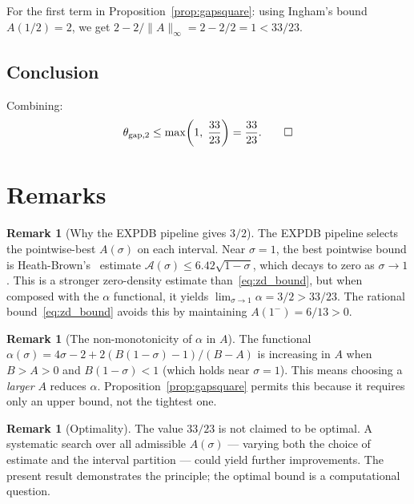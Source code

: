 \documentclass[11pt,a4paper]{amsart}
\theoremstyle{plain}
\theoremstyle{definition}
\newtheorem{remark}[theorem]{Remark}
\begin{document}
For the first term in Proposition~\ref{prop:gapsquare}: using Ingham's bound $A(1/2) = 2$, we get $2 - 2/\|A\|_\infty = 2 - 2/2 = 1 < 33/23$.

\subsection{Conclusion}

Combining:
\[
\theta_{\mathrm{gap},2} \leq \max\!\left(1,\; \frac{33}{23}\right) = \frac{33}{23}. \qedhere
\]

\section{Remarks}

\begin{remark}[Why the EXPDB pipeline gives $3/2$]
The EXPDB pipeline selects the pointwise-best $A(\sigma)$ on each interval. Near $\sigma = 1$, the best pointwise bound is Heath-Brown's~\cite{HeathBrown2017} estimate $\mathcal{A}(\sigma) \leq 6.42\sqrt{1-\sigma}$, which decays to zero as $\sigma \to 1$. This is a stronger zero-density estimate than~\eqref{eq:zd_bound}, but when composed with the $\alpha$ functional, it yields $\lim_{\sigma \to 1} \alpha = 3/2 > 33/23$. The rational bound~\eqref{eq:zd_bound} avoids this by maintaining $A(1^-) = 6/13 > 0$.
\end{remark}

\begin{remark}[The non-monotonicity of $\alpha$ in $A$]
The functional $\alpha(\sigma) = 4\sigma - 2 + 2(B(1-\sigma) - 1)/(B - A)$ is increasing in $A$ when $B > A > 0$ and $B(1-\sigma) < 1$ (which holds near $\sigma = 1$). This means choosing a \emph{larger} $A$ reduces $\alpha$. Proposition~\ref{prop:gapsquare} permits this because it requires only an upper bound, not the tightest one.
\end{remark}

\begin{remark}[Optimality]
The value $33/23$ is not claimed to be optimal. A systematic search over all admissible $A(\sigma)$ — varying both the choice of estimate and the interval partition — could yield further improvements. The present result demonstrates the principle; the optimal bound is a computational question.
\end{remark}

\end{document}
